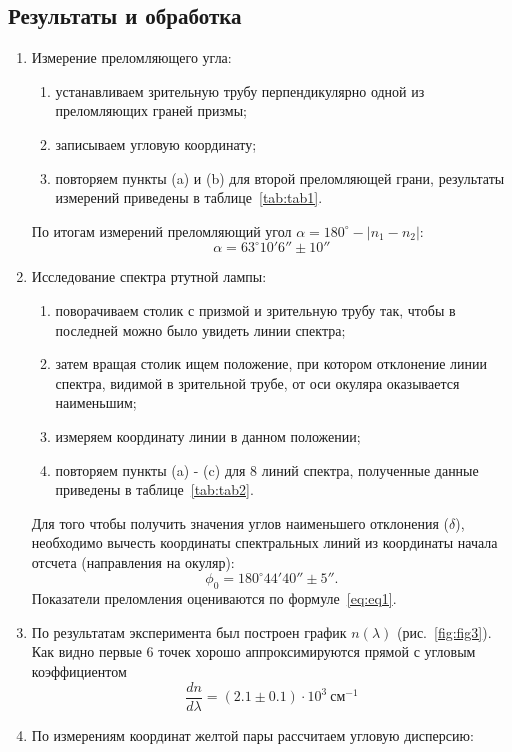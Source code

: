 \documentclass[12pt]{article}
\begin{document}
    \subsection*{Результаты и обработка}
    \begin{enumerate}
        \item Измерение преломляющего угла:
        \begin{enumerate}
            \item устанавливаем зрительную трубу перпендикулярно одной из
            преломляющих граней призмы;
            \item записываем угловую координату;
            \item повторяем пункты (a) и (b) для второй преломляющей грани,
            результаты измерений приведены в таблице\ \ref{tab:tab1}.
        \end{enumerate}
        По итогам измерений преломляющий угол $\alpha = 180^{\circ} - |n_1 - n_2|$:
        \[\alpha = 63^{\circ}10'6'' \pm 10''\]
        \item Исследование спектра ртутной лампы:
        \begin{enumerate}
            \item поворачиваем столик с призмой и зрительную трубу так,
            чтобы в последней можно было увидеть линии спектра;
            \item затем вращая столик ищем положение,
            при котором отклонение линии спектра, видимой в зрительной трубе,
            от оси окуляра оказывается наименьшим;
            \item измеряем координату линии в данном положении;
            \item повторяем пункты (a) - (c) для 8 линий спектра,
            полученные данные приведены в таблице\ \ref{tab:tab2}.
        \end{enumerate}
        Для того чтобы получить значения углов наименьшего отклонения ($\delta$),
        необходимо вычесть координаты спектральных линий из координаты начала отсчета
        (направления на окуляр):
        \[\phi_0 = 180^{\circ}44'40'' \pm 5''.\]
        Показатели преломления оцениваются по формуле\ \eqref{eq:eq1}.
        \item По результатам эксперимента был построен график $n(\lambda)$ (рис.\ \ref{fig:fig3}).
        Как видно первые 6 точек хорошо аппроксимируются прямой с угловым коэффициентом
        \[\frac{dn}{d\lambda} = (2.1 \pm 0.1) \cdot 10^{3}\ \text{см}^{-1}\]
        \item По измерениям координат желтой пары рассчитаем угловую дисперсию:

\end{enumerate}
\end{document}

